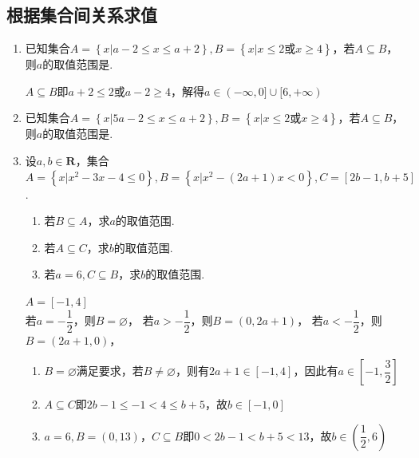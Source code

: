 \subsection*{根据集合间关系求值}
\begin{enumerate}
    \item 已知集合$A = \left\{x | a-2 \leq x \leq a+2\right\}, B = \left\{x|x \leq 2 \mbox{或} x \geq 4\right\}$，若$A \subseteq B$，则$a$的取值范围是\blkda[4]{$(-\infty, 0] \cup [6, +\infty)$}.
    \begin{jieda}
        $A \subseteq B$即$a+2 \leq 2$或$a-2 \geq 4$，解得$a \in (-\infty, 0] \cup [6, +\infty)$
    \end{jieda}
    \item 已知集合$A = \left\{x | 5a-2 \leq x \leq a+2\right\}, B = \left\{x|x \leq 2 \mbox{或} x \geq 4\right\}$，若$A \subseteq B$，则$a$的取值范围是\blkda[4]{$(-\infty, 0] \cup (1, +\infty)$}.
    \begin{jieda}
    \end{jieda}
    \item 设$a, b \in \mathbf{R}$，集合$A = \left\{x | x^2 - 3x - 4 \leq 0\right\}, B = \left\{x | x^2 - (2a+1)x < 0\right\}, C = [2b-1, b+5]$.
    \begin{enumerate}
        \item 若$B \subseteq A$，求$a$的取值范围.
        \item 若$A \subseteq C$，求$b$的取值范围.
        \item 若$a = 6, C \subseteq B$，求$b$的取值范围.
    \end{enumerate}
    \begin{jieda}
        $A = [-1, 4]$ \\
        若$a = -\dfrac{1}{2}$，则$B = \varnothing$，
        若$a > -\dfrac{1}{2}$，则$B = (0, 2a+1)$，
        若$a < -\dfrac{1}{2}$，则$B = (2a+1, 0)$，
        \begin{enumerate}
            \item $B = \varnothing$满足要求，若$B \neq \varnothing$，则有$2a+1 \in [-1, 4]$，因此有$a \in \left[-1, \dfrac{3}{2}\right]$
            \item $A \subseteq C$即$2b-1 \leq -1 < 4 \leq b+5$，故$b \in [-1, 0]$
            \item $a = 6, B = (0, 13)$，$C \subseteq B$即$0 < 2b-1 < b + 5 < 13$，故$b \in \left(\dfrac{1}{2}, 6\right)$
        \end{enumerate}
    \end{jieda}
\end{enumerate}
